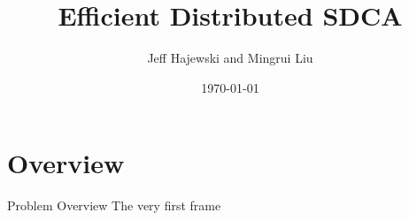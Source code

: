 \documentclass{beamer}
\title{Efficient Distributed SDCA}
\author{Jeff Hajewski and Mingrui Liu}
\date{\today}
\institute{University of Iowa}
\begin{document}
\maketitle
\section{Overview}
\begin{frame}{Problem Overview}
    The very first frame
\end{frame}
\end{document}
